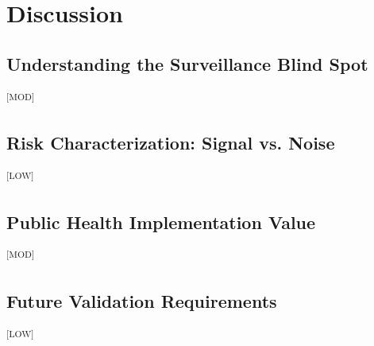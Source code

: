 \documentclass[12pt]{article}
\newcommand{\GradeModerate}{\textsuperscript{\textsf{[MOD]}}}
\newcommand{\GradeLow}{\textsuperscript{\textsf{[LOW]}}}
\begin{document}
\section{Discussion}\label{sec:discussion}

\subsection{Understanding the Surveillance Blind Spot}\label{sec:discussion_blindspot}\GradeModerate



\subsection{Risk Characterization: Signal vs. Noise}\label{sec:discussion_risk}\GradeLow



\subsection{Public Health Implementation Value}\label{sec:discussion_phv}\GradeModerate



\subsection{Future Validation Requirements}\label{sec:discussion_future}\GradeLow



\end{document}
